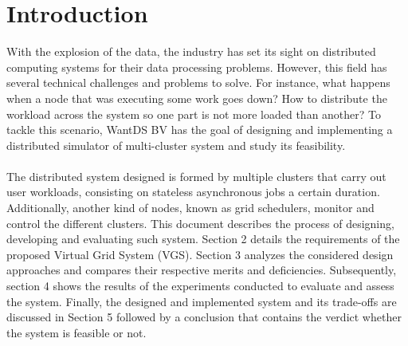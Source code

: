 
\section{Introduction}
With the explosion of the data, the industry has set its sight on distributed computing systems for their data processing problems. However, this field has several technical challenges and problems to solve. For instance, what happens when a node that was executing some work goes down? How to distribute the workload across the system so one part is not more loaded than another? To tackle this scenario, WantDS BV has the goal of designing and implementing a distributed simulator of multi-cluster system and study its feasibility. 
\\\\
The distributed system designed is formed by multiple clusters that carry out user workloads, consisting on stateless asynchronous jobs a certain duration. Additionally, another kind of nodes, known as grid schedulers, monitor and control the different clusters.
This document describes the process of designing, developing and evaluating such system. Section 2 details the requirements of the proposed Virtual Grid System (VGS). Section 3 analyzes the considered design approaches and compares their respective merits and deficiencies. Subsequently, section 4 shows the results of the experiments conducted to evaluate and assess the system. Finally, the designed and implemented system and its trade-offs are discussed in Section 5 followed by a conclusion that contains the verdict whether the system is feasible or not.
